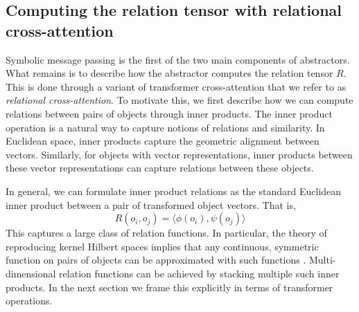 \subsection{Computing the relation tensor with relational cross-attention}

Symbolic message passing is the first of the two main
components
of abstractors. What remains is to describe how the abstractor computes the relation tensor $R$. This is
done through a variant of transformer cross-attention that we refer to as \textit{relational cross-attention}.
To motivate this, we first describe how we can compute relations between pairs of objects through inner products.
The inner product operation is a natural way to capture notions of relations and similarity. In Euclidean space,
inner products capture the geometric alignment between vectors. Similarly, for objects with vector representations,
inner products between these vector representations can capture relations between these objects.

In general, we can formulate inner product relations as the standard Euclidean inner product between a pair of transformed object vectors. That is, 
\begin{equation}
    R(o_i, o_j) = \langle \phi(o_i), \psi(o_j) \rangle
    \label{eq:relation_innerproduct}
\end{equation}
This captures a large class of relation functions. In particular, the theory of reproducing kernel Hilbert spaces implies that any continuous, symmetric function on pairs of objects can be approximated with such functions
\citep{universal}. Multi-dimensional relation functions can be achieved by stacking multiple such inner products.
In the next section we frame this explicitly in terms of transformer operations.


% 

